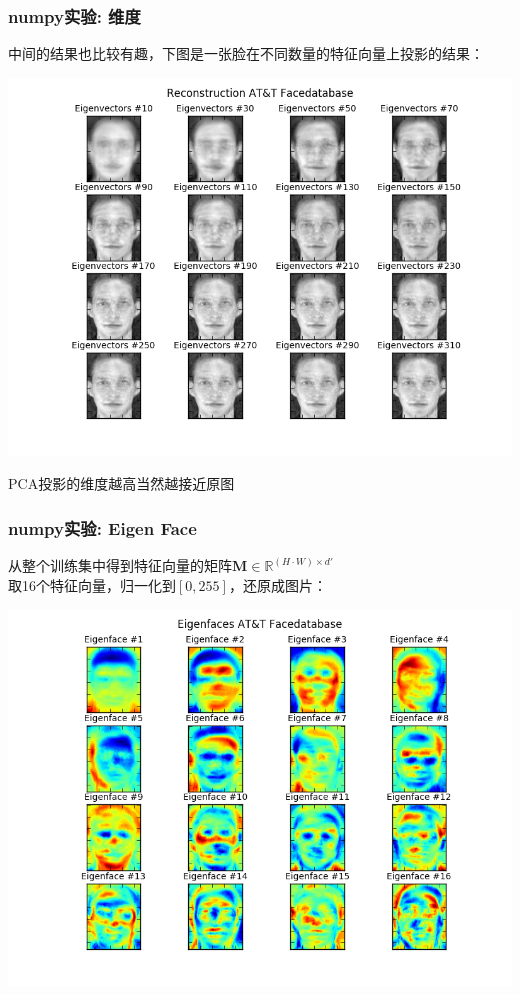\documentclass[24pt]{beamer}
\begin{document}
\begin{frame}
\frametitle{numpy实验: 维度}
中间的结果也比较有趣，下图是一张脸在不同数量的特征向量上投影的结果：
\begin{center}
\includegraphics[width=0.6\linewidth]{../image/eigenvectors.png}
\end{center}
PCA投影的维度越高当然越接近原图
\end{frame}
\begin{frame}
\frametitle{numpy实验: Eigen Face}
从整个训练集中得到特征向量的矩阵$\mathbf{M} \in \mathbb{R}^{(H \cdot W) \times d'}$\\
取16个特征向量，归一化到$[0,255]$，还原成图片：
\begin{center}
\includegraphics[width=0.65\linewidth]{../image/eigenfaces.png}
\end{center}
\end{frame}
\end{document}
